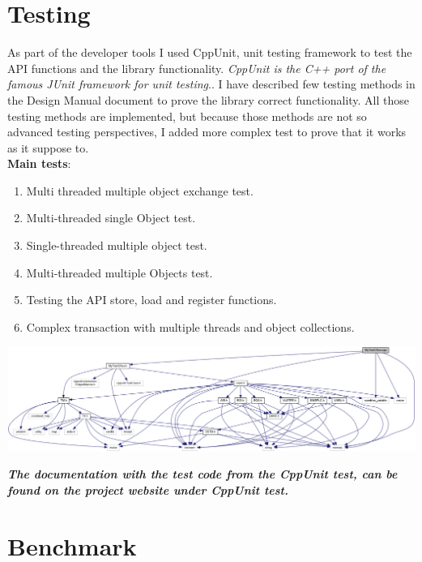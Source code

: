 \documentclass[12pt]{article}
\begin{document}
\section{Testing}
As part of the developer tools I used CppUnit, unit testing framework to test the API functions and the library functionality.  
\textit{CppUnit is the C++ port of the famous JUnit framework for unit testing}.\cite{sourceforge}\cite{cookbook}. I have described few testing methods in the Design Manual document to prove the library correct functionality. All those testing methods are implemented, but because those methods are not so advanced testing perspectives, I added more complex test to prove that it works as it suppose to.\\
\textbf{Main tests}:
\begin{enumerate}
\item Multi threaded multiple object exchange test.
\item Multi-threaded single Object test.
\item Single-threaded multiple object test.
\item Multi-threaded multiple Objects test.
\item Testing the API store, load and register functions.
\item Complex transaction with multiple threads and object collections.
\end{enumerate}

\includegraphics[scale=0.2]{Pictures/test.png}

\textit{\textbf{The documentation with the test code from the CppUnit test, can be found on the project website under CppUnit test.}}

\section{Benchmark}
\end{document}
